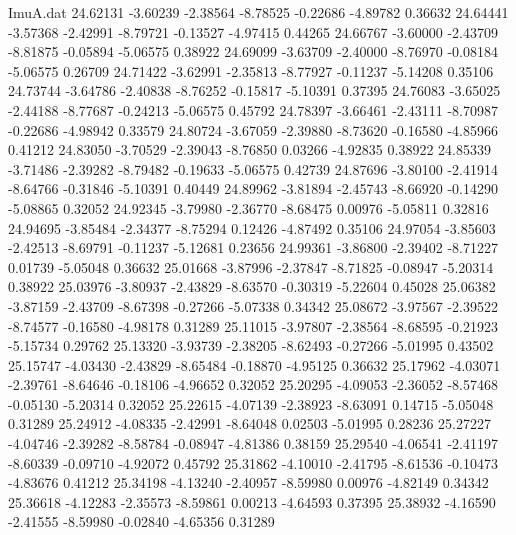 \begin{filecontents}{ImuA.dat}
  24.62131   -3.60239   -2.38564   -8.78525   -0.22686   -4.89782    0.36632
  24.64441   -3.57368   -2.42991   -8.79721   -0.13527   -4.97415    0.44265
  24.66767   -3.60000   -2.43709   -8.81875   -0.05894   -5.06575    0.38922
  24.69099   -3.63709   -2.40000   -8.76970   -0.08184   -5.06575    0.26709
  24.71422   -3.62991   -2.35813   -8.77927   -0.11237   -5.14208    0.35106
  24.73744   -3.64786   -2.40838   -8.76252   -0.15817   -5.10391    0.37395
  24.76083   -3.65025   -2.44188   -8.77687   -0.24213   -5.06575    0.45792
  24.78397   -3.66461   -2.43111   -8.70987   -0.22686   -4.98942    0.33579
  24.80724   -3.67059   -2.39880   -8.73620   -0.16580   -4.85966    0.41212
  24.83050   -3.70529   -2.39043   -8.76850    0.03266   -4.92835    0.38922
  24.85339   -3.71486   -2.39282   -8.79482   -0.19633   -5.06575    0.42739
  24.87696   -3.80100   -2.41914   -8.64766   -0.31846   -5.10391    0.40449
  24.89962   -3.81894   -2.45743   -8.66920   -0.14290   -5.08865    0.32052
  24.92345   -3.79980   -2.36770   -8.68475    0.00976   -5.05811    0.32816
  24.94695   -3.85484   -2.34377   -8.75294    0.12426   -4.87492    0.35106
  24.97054   -3.85603   -2.42513   -8.69791   -0.11237   -5.12681    0.23656
  24.99361   -3.86800   -2.39402   -8.71227    0.01739   -5.05048    0.36632
  25.01668   -3.87996   -2.37847   -8.71825   -0.08947   -5.20314    0.38922
  25.03976   -3.80937   -2.43829   -8.63570   -0.30319   -5.22604    0.45028
  25.06382   -3.87159   -2.43709   -8.67398   -0.27266   -5.07338    0.34342
  25.08672   -3.97567   -2.39522   -8.74577   -0.16580   -4.98178    0.31289
  25.11015   -3.97807   -2.38564   -8.68595   -0.21923   -5.15734    0.29762
  25.13320   -3.93739   -2.38205   -8.62493   -0.27266   -5.01995    0.43502
  25.15747   -4.03430   -2.43829   -8.65484   -0.18870   -4.95125    0.36632
  25.17962   -4.03071   -2.39761   -8.64646   -0.18106   -4.96652    0.32052
  25.20295   -4.09053   -2.36052   -8.57468   -0.05130   -5.20314    0.32052
  25.22615   -4.07139   -2.38923   -8.63091    0.14715   -5.05048    0.31289
  25.24912   -4.08335   -2.42991   -8.64048    0.02503   -5.01995    0.28236
  25.27227   -4.04746   -2.39282   -8.58784   -0.08947   -4.81386    0.38159
  25.29540   -4.06541   -2.41197   -8.60339   -0.09710   -4.92072    0.45792
  25.31862   -4.10010   -2.41795   -8.61536   -0.10473   -4.83676    0.41212
  25.34198   -4.13240   -2.40957   -8.59980    0.00976   -4.82149    0.34342
  25.36618   -4.12283   -2.35573   -8.59861    0.00213   -4.64593    0.37395
  25.38932   -4.16590   -2.41555   -8.59980   -0.02840   -4.65356    0.31289

\end{filecontents}
